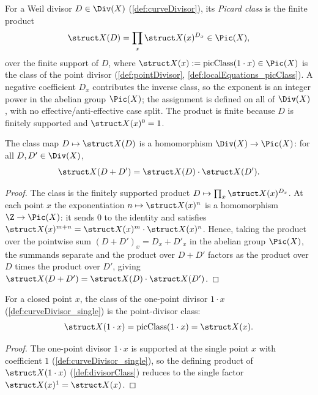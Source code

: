 \begin{definition}
  \label{def:divisorClass}
  \leanok
  For a Weil divisor \(D \in \Div(X)\) (\ref{def:curveDivisor}), its \emph{Picard class} is the
  finite product
  \[
    \struct X(D) = \prod_{x} \struct X(x)^{D_x} \in \Pic(X),
  \]
  over the finite support of \(D\), where \(\struct X(x) := \mathrm{picClass}(1 \cdot x) \in
  \Pic(X)\) is the class of the point divisor (\ref{def:pointDivisor}, \ref{def:localEquations_picClass}).
  A negative coefficient \(D_x\) contributes the inverse class, so the exponent is an integer power
  in the abelian group \(\Pic(X)\); the assignment is defined on all of \(\Div(X)\), with no
  effective/anti-effective case split. The product is finite because \(D\) is finitely supported
  and \(\struct X(x)^0 = 1\).
\end{definition}

\begin{theorem}
  \label{thm:divisorClass_add}
  \leanok
  The class map \(D \mapsto \struct X(D)\) is a homomorphism \(\Div(X) \to \Pic(X)\): for all
  \(D, D' \in \Div(X)\),
  \[
    \struct X(D + D') = \struct X(D) \cdot \struct X(D') .
  \]
\end{theorem}
\begin{proof}
  \leanok
  The class is the finitely supported product \(D \mapsto \prod_x \struct X(x)^{D_x}\). At each
  point \(x\) the exponentiation \(n \mapsto \struct X(x)^n\) is a homomorphism \(\Z \to \Pic(X)\):
  it sends \(0\) to the identity and satisfies \(\struct X(x)^{m+n} = \struct X(x)^m \cdot \struct
  X(x)^n\). Hence, taking the product over the pointwise sum \((D + D')_x = D_x + D'_x\) in the
  abelian group \(\Pic(X)\), the summands separate and the product over \(D + D'\) factors as the
  product over \(D\) times the product over \(D'\), giving \(\struct X(D + D') = \struct X(D) \cdot
  \struct X(D')\).
\end{proof}

\begin{theorem}
  \label{thm:divisorClass_single}
  \leanok
  For a closed point \(x\), the class of the one-point divisor \(1 \cdot x\)
  (\ref{def:curveDivisor_single}) is the point-divisor class:
  \[
    \struct X(1 \cdot x) = \mathrm{picClass}(1 \cdot x) = \struct X(x) .
  \]
\end{theorem}
\begin{proof}
  \leanok
  The one-point divisor \(1 \cdot x\) is supported at the single point \(x\) with coefficient \(1\)
  (\ref{def:curveDivisor_single}), so the defining product of \(\struct X(1 \cdot x)\)
  (\ref{def:divisorClass}) reduces to the single factor \(\struct X(x)^1 = \struct X(x)\).
\end{proof}

